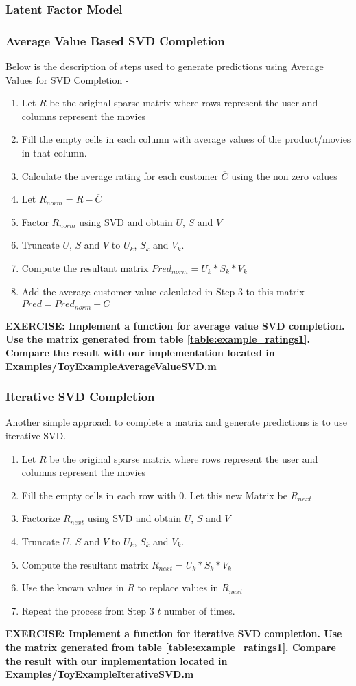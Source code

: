 \documentclass{article}
\begin{document}
  \subsubsection{Latent Factor Model}
  \subsubsection{Average Value Based SVD Completion}
  Below is the description of steps used to generate predictions using Average Values for SVD Completion -
  \begin{enumerate}
    \item Let $R$ be the original sparse matrix where rows represent the user and columns represent the movies
    \item Fill the empty cells in each column with average values of the product/movies in that column.
    \item Calculate the average rating for each customer $\overline{C}$ using the non zero values
    \item Let $R_{norm} = R - \overline{C}$  
    \item Factor $R_{norm}$ using SVD and obtain $U$, $S$ and $V$
    \item Truncate $U$, $S$ and $V$ to $U_k$, $S_k$ and $V_k$.
    \item Compute the resultant matrix $Pred_{norm} = U_k*S_k*V_k$
    \item Add the average customer value calculated in Step 3 to this matrix $Pred = Pred_{norm} + \overline{C} $
  \end{enumerate}
  {\color{blue}\textbf{EXERCISE: Implement a function for average value SVD completion. Use the matrix generated from table \ref{table:example_ratings1}. Compare the result with our implementation located in Examples/ToyExampleAverageValueSVD.m}}
  \subsubsection{Iterative SVD Completion}
  Another simple approach to complete a matrix and generate predictions is to use iterative SVD. 
  \begin{enumerate}
    \item Let $R$ be the original sparse matrix where rows represent the user and columns represent the movies
    \item Fill the empty cells in each row with 0. Let this new Matrix be $R_{next}$
    \item Factorize $R_{next}$ using SVD and obtain $U$, $S$ and $V$
    \item Truncate $U$, $S$ and $V$ to $U_k$, $S_k$ and $V_k$.
    \item Compute the resultant matrix $R_{next} = U_k*S_k*V_k$
    \item Use the known values in $R$ to replace values in $R_{next}$
    \item Repeat the process from Step 3 $t$ number of times.
  \end{enumerate}
  {\color{blue}\textbf{EXERCISE: Implement a function for iterative SVD completion. Use the matrix generated from table \ref{table:example_ratings1}. Compare the result with our implementation located in Examples/ToyExampleIterativeSVD.m}}
\end{document}
